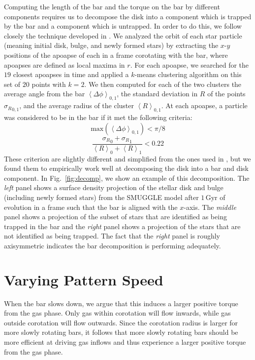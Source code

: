 \documentclass[fleqn,usenatbib]{mnras}
\begin{document}
Computing the length of the bar and the torque on the bar by different
components requires us to decompose the disk into a component which is trapped
by the bar and a component which is untrapped. In order to do this, we follow
closely the technique developed in \citet{2016MNRAS.463.1952P}. We analyzed the
orbit of each star particle (meaning initial disk, bulge, and newly formed
stars) by extracting the $x$-$y$ positions of the apoapse of each in a frame
corotating with the bar, where apoapses are defined as local maxima in $r$. For
each apoapse, we searched for the $19$ closest apoapses in time and applied a
$k$-means clustering algorithm on this set of $20$ points with $k=2$. We then
computed for each of the two clusters the average angle from the bar
$\left<\Delta \phi\right>_{0,1}$, the standard deviation in $R$ of the points
${\sigma_R}_{0,1}$, and the average radius of the cluster
$\left<R\right>_{0,1}$. At each apoapse, a particle was considered to be in the
bar if it met the following criteria:
\begin{equation}
\textrm{max}\left(\left<\Delta \phi\right>_{0,1}\right) < \pi / 8
\end{equation}
\begin{equation}
\frac{{\sigma_R}_0 + {\sigma_R}_1}{\left<R\right>_0 + \left<R\right>_1} < 0.22
\end{equation}
These criterion are slightly different and simplified from the ones used in \citet{2016MNRAS.463.1952P}, but we found them to empirically work well at
decomposing the disk into a bar and disk component. In Fig.~\ref{fig:decomp}, we show an example of this decomposition. The
\textit{left} panel shows a surface density projection of the stellar disk and
bulge (including newly formed stars) from the SMUGGLE model after
$1\,\text{Gyr}$ of evolution in a frame such that the bar is aligned with the
$x$-axis. The \textit{middle} panel shows a projection of the subset of stars
that are identified as being trapped in the bar and the \textit{right} panel
shows a projection of the stars that are not identified as being trapped. The
fact that the \textit{right} panel is roughly axisymmetric indicates the bar
decomposition is performing adequately.

\section{Varying Pattern Speed}
\label{app:varyps}
When the bar slows down, we argue that this induces a larger positive torque
from the gas phase. Only gas within corotation will flow inwards, while gas
outside corotation will flow outwards\cite{2011MNRAS.415.1027H}. Since the
corotation radius is larger for more slowly rotating bars, it follows that
more slowly rotating bars should be more efficient at driving gas inflows and
thus experience a larger positive torque from the gas phase.
\end{document}
